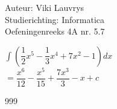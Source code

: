 \documentclass[a4paper]{article}
\begin{document}
  
\noindent \large Auteur: Viki	Lauvrys \\
\noindent \large Studierichting: Informatica\\
\noindent \large Oefeningenreeks 4A nr. 5.7\\

\medskip

\normalsize

$\displaystyle\int \left(\dfrac{1}{2}x^5 - \dfrac{1}{3}x^4 + 7x^2 -1\right) dx $ \\

$ = \dfrac{x^6}{12} - \dfrac{x^5}{15} + \dfrac{7x^3}{3} -x + c $ \\ 



\begin{thebibliography}{999}
\end{thebibliography}
\end{document}
